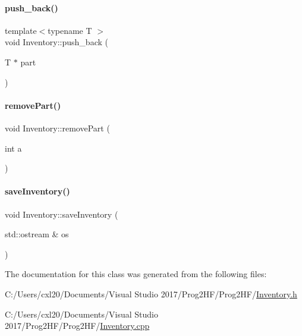 \paragraph{\texorpdfstring{push\_back()}{push\_back()}}
{\footnotesize\ttfamily template$<$typename T $>$ \\
void Inventory\+::push\+\_\+back (\begin{DoxyParamCaption}\item[{T $\ast$}]{part }\end{DoxyParamCaption})}

\mbox{\label{class_inventory_a30f0fd3321c6cc606508684ce9d666ff}} 
\paragraph{\texorpdfstring{removePart()}{removePart()}}
{\footnotesize\ttfamily void Inventory\+::remove\+Part (\begin{DoxyParamCaption}\item[{int}]{a }\end{DoxyParamCaption})}

\mbox{\label{class_inventory_a084bafb32ed7dc4288fac96828c5302a}} 
\paragraph{\texorpdfstring{saveInventory()}{saveInventory()}}
{\footnotesize\ttfamily void Inventory\+::save\+Inventory (\begin{DoxyParamCaption}\item[{std\+::ostream \&}]{os }\end{DoxyParamCaption})}



The documentation for this class was generated from the following files\+:\begin{DoxyCompactItemize}
\item 
C\+:/\+Users/cxl20/\+Documents/\+Visual Studio 2017/\+Prog2\+H\+F/\+Prog2\+H\+F/\mbox{\hyperlink{_inventory_8h}{Inventory.\+h}}\item 
C\+:/\+Users/cxl20/\+Documents/\+Visual Studio 2017/\+Prog2\+H\+F/\+Prog2\+H\+F/\mbox{\hyperlink{_inventory_8cpp}{Inventory.\+cpp}}\end{DoxyCompactItemize}
